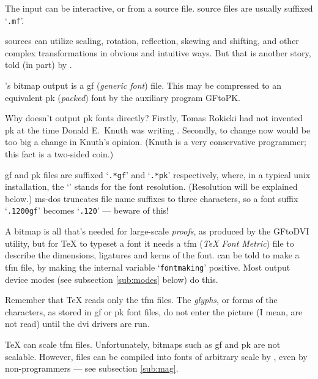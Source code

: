 The input can be interactive, or from a source file.
\MF{} source files are usually suffixed `{\tt .mf}'.

\MF{} sources can utilize scaling, rotation, reflection, skewing and shifting,
and other complex transformations in obvious and intuitive ways.
But that is another story, told (in part) by \MFbook{}.

\MF{}'s bitmap output is a {\sc gf} ({\em generic font\/}) file.
This may be compressed to an equivalent {\sc pk} ({\em packed\/}) font
by the auxiliary program {\sf GFtoPK}.

Why doesn't \MF{} output {\sc pk} fonts directly?  Firstly, Tomas
{\sc Rokicki} had not invented {\sc pk} at the time Donald
E.~{\sc Knuth} was writing \MF{}.  Secondly, to change \MF{} now
would be too big a change in {\sc Knuth}'s opinion.  ({\sc Knuth}
is a very conservative programmer; this fact is a two-sided coin.)

{\sc gf} and {\sc pk} files are suffixed `{\tt .*gf}' and `{\tt .*pk}'
respectively, where, in a typical {\sc unix} installation, the
`{\tt *}' stands for the font resolution.
(Resolution will be explained below.)
{\sc ms-dos} truncates file name suffixes to three characters, so a
font suffix `{\tt .1200gf}' becomes `{\tt .120}' --- beware of this!

A bitmap is all that's needed for large-scale {\em proofs},
as produced by the {\sf GFtoDVI} utility,
but for \TeX{} to typeset a font it needs a {\sc tfm}
({\em \TeX{} Font Metric\/}) file to describe the dimensions, ligatures
and kerns of the font.  \MF{} can be told to make a {\sc tfm} file,
by making the internal variable `{\tt fontmaking}' positive.  Most
output device modes (see subsection \ref{sub:modes} below) do this.

Remember that \TeX{} reads only the {\sc tfm} files.
The {\em glyphs}, or forms of the characters, as stored in {\sc gf}
or {\sc pk} font files, do not enter the picture
(I mean, are not read)
until the {\sc dvi} drivers are run.

\TeX{} can scale {\sc tfm} files.  Unfortunately, bitmaps such as
{\sc gf} and {\sc pk} are not scalable.
However, \MF{} files can be compiled into fonts of arbitrary scale
by \MF{}, even
by non-programmers --- see subsection \ref{sub:mag}.


